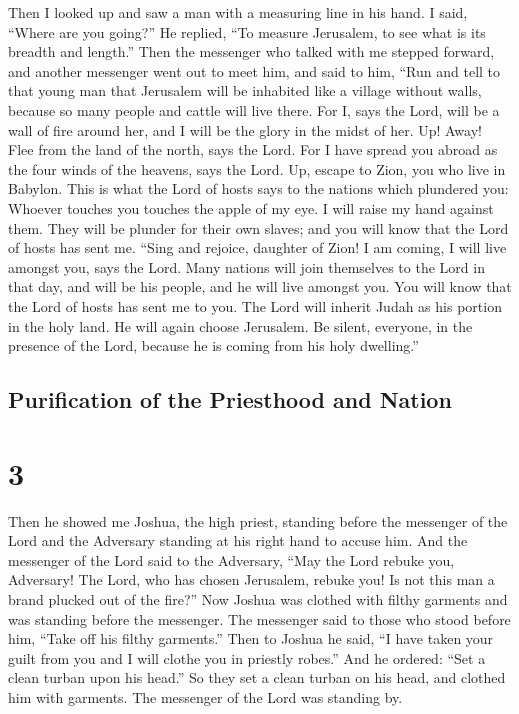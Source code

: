  Then I looked up and saw a man with a measuring line in his
hand.  I said, ``Where are you going?'' He replied, ``To
measure Jerusalem, to see what is its breadth and length.'' 
Then the messenger who talked with me stepped forward, and another
messenger went out to meet him,  and said to him, ``Run and
tell to that young man that Jerusalem will be inhabited like a village
without walls, because so many people and cattle will live there.
 For I, says the Lord, will be a wall of fire around her,
and I will be the glory in the midst of her.  Up! Away! Flee
from the land of the north, says the Lord. For I have spread you abroad
as the four winds of the heavens, says the Lord.  Up, escape
to Zion, you who live in Babylon.  This is what the Lord of
hosts says to the nations which plundered you: Whoever touches you
touches the apple of my eye.  I will raise my hand against
them. They will be plunder for their own slaves; and you will know that
the Lord of hosts has sent me.  ``Sing and rejoice,
daughter of Zion! I am coming, I will live amongst you, says the Lord.
 Many nations will join themselves to the Lord in that day,
and will be his people, and he will live amongst you. You will know that
the Lord of hosts has sent me to you.  The Lord will
inherit Judah as his portion in the holy land. He will again choose
Jerusalem.  Be silent, everyone, in the presence of the
Lord, because he is coming from his holy dwelling.''

\hypertarget{purification-of-the-priesthood-and-nation}{%
\subsection{Purification of the Priesthood and
Nation}\label{purification-of-the-priesthood-and-nation}}

\hypertarget{section-2}{%
\section{3}\label{section-2}}

 Then he showed me Joshua, the high priest, standing before
the messenger of the Lord and the Adversary standing at his right hand
to accuse him.  And the messenger of the Lord said to the
Adversary, ``May the Lord rebuke you, Adversary! The Lord, who has
chosen Jerusalem, rebuke you! Is not this man a brand plucked out of the
fire?''  Now Joshua was clothed with filthy garments and was
standing before the messenger.  The messenger said to those
who stood before him, ``Take off his filthy garments.'' Then to Joshua
he said, ``I have taken your guilt from you and I will clothe you in
priestly robes.''  And he ordered: ``Set a clean turban upon
his head.'' So they set a clean turban on his head, and clothed him with
garments. The messenger of the Lord was standing by.

